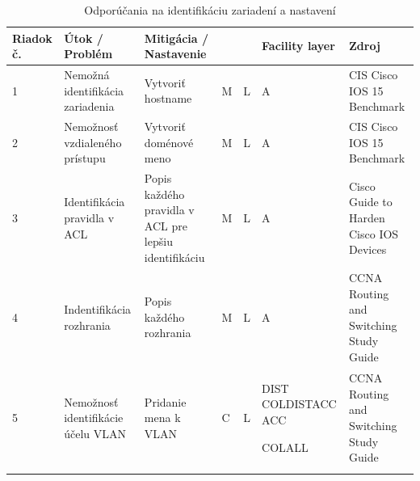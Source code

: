 \begin{longtable}[!htbp]{|C{2.5em}L{9em}L{9em}C{2em}C{2.5em}C{7.5em}L{10em}|}
	
	\hline
	\centering
	
	Riadok č.	&Útok / Problém	&Mitigácia / Nastavenie	& 	&	&Facility layer	&Zdroj\\
	\endhead
	
	 1	&Nemožná identifikácia zariadenia	&Vytvoriť hostname	&M	&L	&A	&CIS Cisco IOS 15 Benchmark \cite{CIS_DrTLsgXv24lxeIIM}\\
	2	&Nemožnosť vzdialeného prístupu	&Vytvoriť doménové meno	&M	&L	&A	&CIS Cisco IOS 15 Benchmark \cite{CIS_DrTLsgXv24lxeIIM}\\
	 3	&Identifikácia pravidla v ACL	&Popis každého pravidla v ACL pre lepšiu identifikáciu	&M	&L	&A	&Cisco Guide to Harden Cisco IOS Devices \cite{Singh2018}\\
	4	&Indentifikácia rozhrania	&Popis každého rozhrania	&M	&L	&A	&CCNA Routing and Switching Study Guide \cite{Lammle2013}\\
	 5	&Nemožnosť identifikácie účelu VLAN	&Pridanie mena k VLAN	&C	&L	&DIST
	COLDISTACC
	ACC
	
	COLALL	&CCNA Routing and Switching Study Guide \cite{Lammle2013}\\
	
	\hline
	\caption{Odporúčania na identifikáciu zariadení a nastavení}
	\label{tab:identification}%
\end{longtable}%

